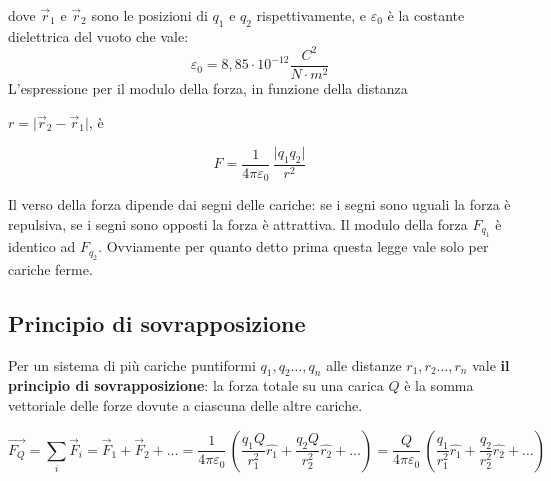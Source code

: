 \documentclass{book}
\begin{document}
dove \(\vec{r}_1\) e \(\vec{r}_2\) sono le posizioni di \(q_1\) e \(q_2\) rispettivamente, e \(\varepsilon_0\) è la costante dielettrica del vuoto che vale: 
$$
\varepsilon_0= 8,85 \cdot 10^{-12} \frac{C^2}{N\cdot m^2}
$$
L'espressione per il modulo della forza, in funzione della distanza 

\(r=\lvert \vec{r}_2-\vec{r}_1\rvert\), è


\begin{figure}[ht]
  \centering
  \begin{minipage}[c]{0.7\textwidth} 
    \[
      F = \frac{1}{4\pi\varepsilon_0}\,\frac{\lvert q_1 q_2\rvert}{r^{2}}
    \]
  \end{minipage}\hfill
  \begin{minipage}[c]{0.28\textwidth}
  \end{minipage}
\end{figure}


Il verso della forza dipende dai segni delle cariche: se i segni sono uguali la forza è repulsiva, se i segni sono opposti la forza è attrattiva.
Il modulo della forza $F_{q_{1}}$ è identico ad $F_{q_{2}}$. Ovviamente per quanto detto prima questa legge vale solo per cariche ferme.


\subsection{Principio di sovrapposizione}
 Per un sistema di più cariche puntiformi $q_1, q_2 \dots, q_n $ alle distanze $r_1, r_2 \dots, r_n $  vale \textbf{il principio di sovrapposizione}: la forza totale su una carica $Q$ è la somma vettoriale delle forze dovute a ciascuna delle altre cariche.


\[
\vec{F_Q}=\sum_i \vec{F}_i = \vec{F}_1+\vec{F}_2+ \dots =  \frac{1}{4\pi\varepsilon_0}\,  ( \frac{ q_1 Q}{r_{1}^{2}} \hat{r_1} + \frac{ q_2 Q}{r_{2}^{2}}\hat{r_2}+\dots)
= \frac{Q}{4\pi\varepsilon_0}\, ( \frac{ q_1 }{r_{1}^{2}}\hat{r_1}+ \frac{ q_2 }{r_{2}^{2}}\hat{r_2}+\dots) 
\]   
\end{document}
